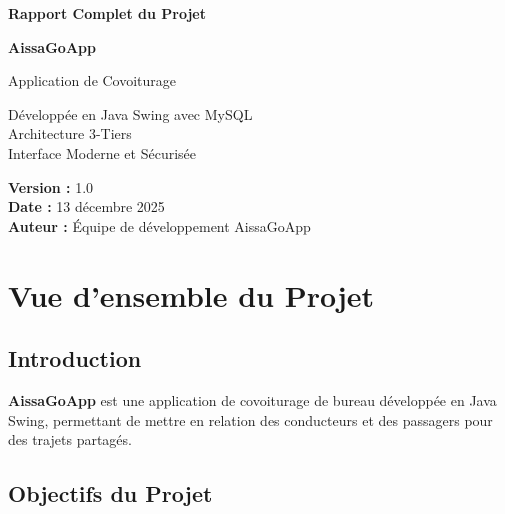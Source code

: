 \documentclass[12pt,a4paper]{report}
\begin{document}
\begin{titlepage}
    \centering
    \vspace*{2cm}
    
    {\Huge\bfseries Rapport Complet du Projet\par}
    \vspace{1cm}
    {\LARGE\bfseries AissaGoApp\par}
    \vspace{0.5cm}
    {\Large Application de Covoiturage\par}
    
    \vspace{2cm}
    
    \begin{tcolorbox}[colback=brandcolor!5,colframe=brandcolor,width=0.8\textwidth]
        \centering
        \large
        Développée en Java Swing avec MySQL\\
        Architecture 3-Tiers\\
        Interface Moderne et Sécurisée
    \end{tcolorbox}
    
    \vfill
    
    {\large
    \textbf{Version :} 1.0\\
    \textbf{Date :} 13 décembre 2025\\
    \textbf{Auteur :} Équipe de développement AissaGoApp
    }
    
\end{titlepage}

\tableofcontents
\newpage

\chapter{Vue d'ensemble du Projet}

\section{Introduction}

\textbf{AissaGoApp} est une application de covoiturage de bureau développée en Java Swing, permettant de mettre en relation des conducteurs et des passagers pour des trajets partagés.

\section{Objectifs du Projet}
\end{document}
